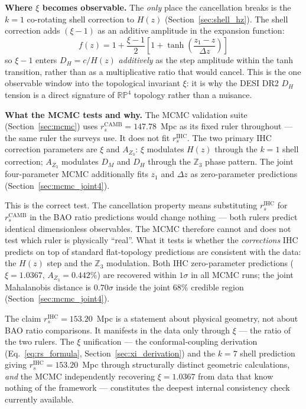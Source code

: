\documentclass[12pt,a4paper]{article}
\begin{document}
\textbf{Where $\xi$ becomes observable.}
The \emph{only} place the cancellation breaks is the $k=1$ co-rotating shell
correction to $H(z)$ (Section~\ref{sec:shell_hz}). The shell correction adds
$(\xi-1)$ as an additive amplitude in the expansion function:
\begin{equation}
  f(z) = 1 + \frac{\xi-1}{2}\left[1 + \tanh\!\left(\frac{z_1-z}{\Delta z}\right)\right]
\end{equation}
so $\xi-1$ enters $D_H = c/H(z)$ \emph{additively} as the step amplitude within the tanh transition,
rather than as a multiplicative ratio that would cancel. This is the one observable
window into the topological invariant $\xi$: it is why the DESI DR2 $D_H$ tension
is a direct signature of $\mathbb{RP}^4$ topology rather than a nuisance.

\textbf{What the MCMC tests and why.}
The MCMC validation suite (Section~\ref{sec:mcmc}) uses $r_s^\mathrm{CAMB} =
147.78$~Mpc as its fixed ruler throughout --- the same ruler the surveys use.
It does not fit $r_s^\mathrm{IHC}$. The two primary IHC correction parameters are
$\xi$ and $A_{Z_3}$: $\xi$ modulates $H(z)$ through the $k=1$ shell
correction; $A_{Z_3}$ modulates $D_M$ and $D_H$ through the $\mathbb{Z}_3$
phase pattern. The joint four-parameter MCMC additionally fits $z_1$ and
$\Delta z$ as zero-parameter predictions (Section~\ref{sec:mcmc_joint4}).

This is the correct test. The cancellation property means substituting
$r_s^\mathrm{IHC}$ for $r_s^\mathrm{CAMB}$ in the BAO ratio predictions would
change nothing --- both rulers predict identical dimensionless observables.
The MCMC therefore cannot and does not test which ruler is physically ``real''.
What it tests is whether the \emph{corrections} IHC predicts on top of standard
flat-topology predictions are consistent with the data: the $H(z)$ step and the
$\mathbb{Z}_3$ modulation. Both IHC zero-parameter predictions ($\xi = 1.0367$,
$A_{Z_3} = 0.442\%$) are recovered within $1\sigma$ in all MCMC runs; the joint
Mahalanobis distance is $0.70\sigma$ inside the joint 68\% credible region
(Section~\ref{sec:mcmc_joint4}).

The claim $r_s^\mathrm{IHC} = 153.20$~Mpc is a statement about physical geometry,
not about BAO ratio comparisons. It manifests in the data only through $\xi$ --- the
ratio of the two rulers. The $\xi$ unification --- the conformal-coupling derivation
(Eq.~\ref{eq:rs_formula}, Section~\ref{sec:xi_derivation})
and the $k=7$ shell prediction giving $r_s^\mathrm{IHC} = 153.20$~Mpc through
structurally distinct geometric calculations, \emph{and} the MCMC independently
recovering $\xi = 1.0367$ from data that know nothing of the framework ---
constitutes the deepest internal consistency check currently available.
\end{document}
